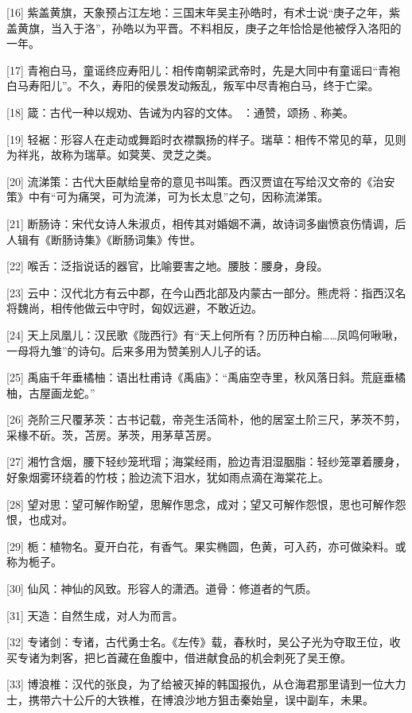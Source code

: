 \documentclass[12pt,UTF8]{ctexbook}
\begin{document}
[16] 紫盖黄旗，天象预占江左地：三国末年吴主孙皓时，有术士说“庚子之年，紫盖黄旗，当入于洛”，孙皓以为平晋。不料相反，庚子之年恰恰是他被俘入洛阳的一年。

[17] 青袍白马，童谣终应寿阳儿：相传南朝梁武帝时，先是大同中有童谣曰“青袍白马寿阳儿”。不久，寿阳的侯景发动叛乱，叛军中尽青袍白马，终于亡梁。

[18] 箴：古代一种以规劝、告诫为内容的文体。 ：通赞，颂扬﹑称美。

[19] 轻裾：形容人在走动或舞蹈时衣襟飘扬的样子。瑞草：相传不常见的草，见则为祥兆，故称为瑞草。如蓂荚、灵芝之类。

[20] 流涕策：古代大臣献给皇帝的意见书叫策。西汉贾谊在写给汉文帝的《治安策》中有“可为痛哭，可为流涕，可为长太息”之句，因称流涕策。

[21] 断肠诗：宋代女诗人朱淑贞，相传其对婚姻不满，故诗词多幽愤哀伤情调，后人辑有《断肠诗集》《断肠词集》传世。

[22] 喉舌：泛指说话的器官，比喻要害之地。腰肢：腰身，身段。

[23] 云中：汉代北方有云中郡，在今山西北部及内蒙古一部分。熊虎将：指西汉名将魏尚，相传他做云中守时，匈奴远避，不敢近边。

[24] 天上凤凰儿：汉民歌《陇西行》有“天上何所有？历历种白榆……凤鸣何啾啾，一母将九雏”的诗句。后来多用为赞美别人儿子的话。

[25] 禹庙千年垂橘柚：语出杜甫诗《禹庙》：“禹庙空寺里，秋风落日斜。荒庭垂橘柚，古屋画龙蛇。”

[26] 尧阶三尺覆茅茨：古书记载，帝尧生活简朴，他的居室土阶三尺，茅茨不剪，采椽不斫。茨，苫房。茅茨，用茅草苫房。

[27] 湘竹含烟，腰下轻纱笼玳瑁；海棠经雨，脸边青泪湿胭脂：轻纱笼罩着腰身，好象烟雾环绕着的竹枝；脸边流下泪水，犹如雨点滴在海棠花上。

[28] 望对思：望可解作盼望，思解作思念，成对；望又可解作怨恨，思也可解作怨恨，也成对。

[29] 栀：植物名。夏开白花，有香气。果实椭圆，色黄，可入药，亦可做染料。或称为栀子。

[30] 仙风：神仙的风致。形容人的潇洒。道骨：修道者的气质。

[31] 天造：自然生成，对人为而言。

[32] 专诸剑：专诸，古代勇士名。《左传》载，春秋时，吴公子光为夺取王位，收买专诸为刺客，把匕首藏在鱼腹中，借进献食品的机会刺死了吴王僚。

[33] 博浪椎：汉代的张良，为了给被灭掉的韩国报仇，从仓海君那里请到一位大力士，携带六十公斤的大铁椎，在博浪沙地方狙击秦始皇，误中副车，未果。
\end{document}
